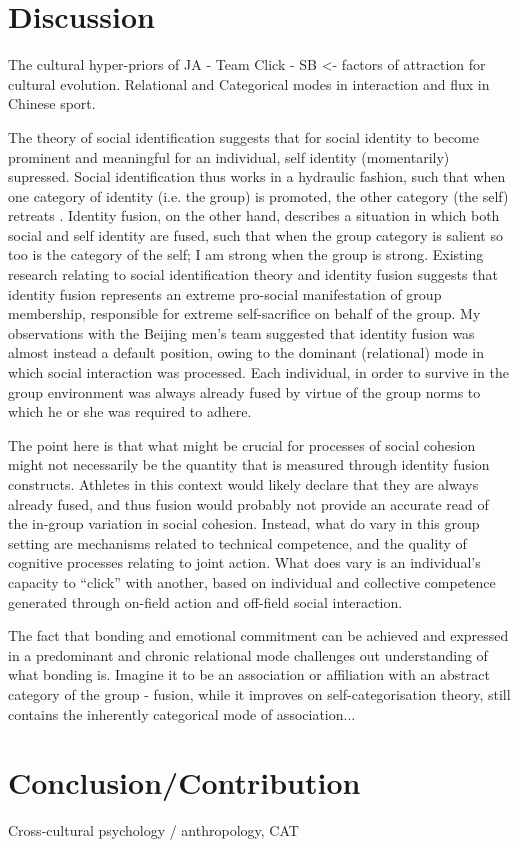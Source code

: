 \begin{CJK}{UTF8}{gbsn}
  \section{Discussion}



  The cultural hyper-priors of JA - Team Click - SB <- factors of attraction for cultural evolution.
  Relational and Categorical modes in interaction and flux in Chinese sport.

  The theory of social identification suggests that for social identity to become prominent and meaningful for an individual, self identity (momentarily) supressed.  Social identification thus works in a hydraulic fashion, such that when one category of identity (i.e. the group) is promoted, the other category (the self) retreats \citep{Swann2009}.  Identity fusion, on the other hand, describes a situation in which both social and self identity are fused, such that when the group category is salient so too is the category of the self; I am strong when the group is strong.  Existing research relating to social identification theory and identity fusion suggests that identity fusion represents an extreme pro-social manifestation of group membership, responsible for extreme self-sacrifice on behalf of the group.  My observations with the Beijing men's team suggested that identity fusion was almost instead a default position, owing to the dominant (relational) mode in which social interaction was processed.  Each individual, in order to survive in the group environment was always already fused by virtue of the group norms to which he or she was required to adhere.

  The point here is that what might be crucial for processes of social cohesion might not necessarily be the quantity that is measured through identity fusion constructs. Athletes in this context would likely declare that they are always already fused, and thus fusion would probably not provide an accurate read of the in-group variation in social cohesion. Instead, what do vary in this group setting are mechanisms related to technical competence, and the quality of cognitive processes relating to joint action.  What does vary is an individual's capacity to ``click'' with another, based on individual and collective competence generated through on-field action and off-field social interaction.

  The fact that bonding and emotional commitment can be achieved and expressed in a predominant and chronic relational mode challenges out understanding of what bonding is.  Imagine it to be an association or affiliation with an abstract category of the group - fusion, while it improves on self-categorisation theory, still contains the inherently categorical mode of association...






  \section{Conclusion/Contribution}
  Cross-cultural psychology / anthropology, CAT


                                                          \end{CJK}
